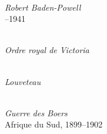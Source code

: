 \noindent\begin{minipage}[t][\textheight][s]{\textwidth}

\vspace*{\fill}

\begin{center}

  \begin{minipage}[t]{0.29\textwidth}
    \begin{flushleft}
      \\[-0.4em]
      {\figcaptionname\itshape Robert Baden-Powell}\\[-0.4em]
      {--1941}
    \end{flushleft}
  \end{minipage}
  \hfill
  \begin{minipage}[t]{0.35\textwidth}
    \centering
    \\[-0.4em]
    {\figcaptionname\itshape Ordre royal de Victoria}
  \end{minipage}
  \hfill
  \begin{minipage}[t]{0.29\textwidth}
    \begin{flushright}
      \\[-0.4em]
      {\figcaptionname\itshape Louveteau}
    \end{flushright}
  \end{minipage}

\end{center}

\vspace{0.3\baselineskip}

\begin{center}

  \begin{minipage}[t]{\textwidth}
    \centering
    \\[-0.4em]
    {\figcaptionname\itshape Guerre des Boers}\\[-0.4em]
    {\figcaptiondetail Afrique du Sud, 1899--1902}
  \end{minipage}

\end{center}

\vspace*{\fill}

\end{minipage}
